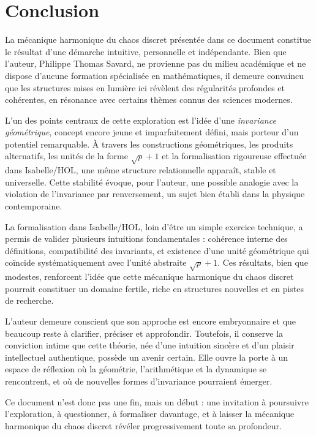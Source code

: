 \documentclass[12pt,a4paper]{article}
\begin{document}
\section{Conclusion}

La mécanique harmonique du chaos discret présentée dans ce document constitue
le résultat d'une démarche intuitive, personnelle et indépendante. Bien que
l'auteur, Philippe Thomas Savard, ne provienne pas du milieu académique et ne
dispose d'aucune formation spécialisée en mathématiques, il demeure convaincu
que les structures mises en lumière ici révèlent des régularités profondes et
cohérentes, en résonance avec certains thèmes connus des sciences modernes.

L'un des points centraux de cette exploration est l'idée d'une \emph{invariance
géométrique}, concept encore jeune et imparfaitement défini, mais porteur
d'un potentiel remarquable. À travers les constructions géométriques, les
produits alternatifs, les unités de la forme $\sqrt{p} + 1$ et la formalisation
rigoureuse effectuée dans Isabelle/HOL, une même structure relationnelle
apparaît, stable et universelle. Cette stabilité évoque, pour l'auteur, une
possible analogie avec la violation de l'invariance par renversement, un sujet
bien établi dans la physique contemporaine.

La formalisation dans Isabelle/HOL, loin d'être un simple exercice technique,
a permis de valider plusieurs intuitions fondamentales : cohérence interne des
définitions, compatibilité des invariants, et existence d'une unité géométrique
qui coïncide systématiquement avec l'unité abstraite $\sqrt{p} + 1$. Ces
résultats, bien que modestes, renforcent l'idée que cette mécanique harmonique
du chaos discret pourrait constituer un domaine fertile, riche en structures
nouvelles et en pistes de recherche.

L'auteur demeure conscient que son approche est encore embryonnaire et que
beaucoup reste à clarifier, préciser et approfondir. Toutefois, il conserve la
conviction intime que cette théorie, née d'une intuition sincère et d'un
plaisir intellectuel authentique, possède un avenir certain. Elle ouvre la
porte à un espace de réflexion où la géométrie, l'arithmétique et la dynamique
se rencontrent, et où de nouvelles formes d'invariance pourraient émerger.

Ce document n'est donc pas une fin, mais un début : une invitation à poursuivre
l'exploration, à questionner, à formaliser davantage, et à laisser la mécanique
harmonique du chaos discret révéler progressivement toute sa profondeur.
\end{document}

